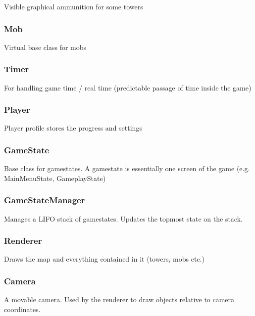 \documentclass[11pt]{article}
\begin{document}
    Visible graphical ammunition for some towers
\subsubsection*{Mob}
\label{sec-3_2_4}

    Virtual base class for mobs
\subsubsection*{Timer}
\label{sec-3_2_5}

    For handling game time / real time (predictable passage of time inside the game)    
\subsubsection*{Player}
\label{sec-3_2_6}

    Player profile stores the progress and settings
\subsubsection*{GameState}
\label{sec-3_2_7}

    Base class for gamestates. A gamestate is essentially one screen
    of the game (e.g. MainMenuState, GameplayState)
\subsubsection*{GameStateManager}
\label{sec-3_2_8}

    Manages a LIFO stack of gamestates.  Updates the topmost state on
    the stack.
\subsubsection*{Renderer}
\label{sec-3_2_9}

    Draws the map and everything contained in it (towers, mobs etc.)
\subsubsection*{Camera}
\label{sec-3_2_10}

    A movable camera. Used by the renderer to draw objects relative to camera coordinates.
\end{document}
